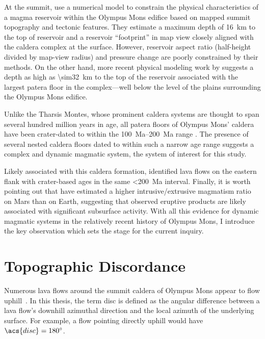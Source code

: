 At the summit, \textcite{zuber_caldera_1992} use a numerical model to constrain the physical characteristics of a magma reservoir within the Olympus Mons edifice based on mapped summit topography and tectonic features. They estimate a maximum depth of \qty{16}{km} to the top of reservoir and a reservoir ``footprint'' in map view closely aligned with the caldera complex at the surface. However, reservoir aspect ratio (half-height divided by map-view radius) and pressure change are poorly constrained by their methods. On the other hand, more recent physical modeling work by \textcite{beddingfield_formation_2011} suggests a depth as high as \qty{\sim32}{km} to the top of the reservoir associated with the largest patera floor in the complex---well below the level of the plains surrounding the Olympus Mons edifice.

Unlike the Tharsis Montes, whose prominent caldera systems are thought to span several hundred million years in age, all patera floors of Olympus Mons' caldera have been crater-dated to within the \qtyrange{100}{200}{Ma} range \parencite{neukum_recent_2004}. The presence of several nested caldera floors dated to within such a narrow age range suggests a complex and dynamic magmatic system, the system of interest for this study.

Likely associated with this caldera formation, \textcite{basilevsky_geologically_2006} identified lava flows on the eastern flank with crater-based ages in the same \qty{<200}{Ma} interval. Finally, it is worth pointing out that \textcite[][and others]{black_eruptibility_2016} have estimated a higher intrusive/extrusive magmatism ratio on Mars than on Earth, suggesting that observed eruptive products are likely associated with significant subsurface activity. With all this evidence for dynamic magmatic systems in the relatively recent history of Olympus Mons, I introduce the key observation which sets the stage for the current inquiry.  

\section{Topographic Discordance}\label{sec:discordance}

Numerous lava flows around the summit caldera of Olympus Mons appear to flow uphill~\parencite[Figure~\ref{fig:uphill-flows}; after][]{mouginis-mark_late-stage_2019}. In this thesis, the term \ac{disc} is defined as the angular difference between a lava flow's downhill azimuthal direction and the local azimuth of the underlying surface. For example, a flow pointing directly uphill would have $\acs{disc}=\ang{180}$. 

